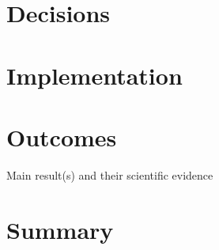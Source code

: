 \section{Decisions}
\section{Implementation}
\section{Outcomes}
Main result(s) and their scientific evidence
\section{Summary}
